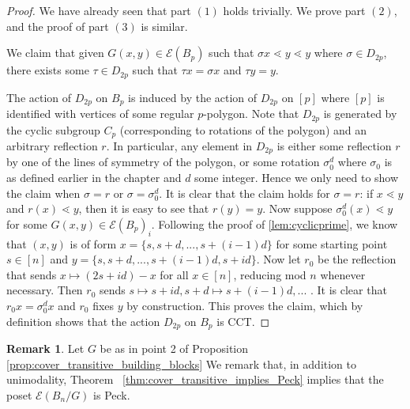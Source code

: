 \documentclass[10 pt]{amsart}
\theoremstyle{plain}
\theoremstyle{definition}
\newtheorem{rem}[thm]{Remark}
\theoremstyle{remark}
\numberwithin{equation}{section}
\begin{document}
\begin{proof}
We have already seen that part $(1)$ holds trivially. We prove part $(2)$, and the proof of part $(3)$ is similar. 

We claim that given $G(x, y) \in \mathcal E (B_p)$ such that $\sigma x \lessdot y \lessdot y$ where $\sigma \in D_{2p}$, there exists some $\tau \in D_{2p}$ such that $\tau x = \sigma x$ and $\tau y = y$. 

The action of $D_{2p}$ on $B_p$ is induced by the action of $D_{2p}$ on $[p]$ where $[p]$ is identified with vertices of some regular $p$-polygon. Note that $D_{2p}$ is generated by the cyclic subgroup $C_p$ (corresponding to rotations of the polygon) and an arbitrary reflection $r$. In particular, any element in $D_{2p}$ is either some reflection $r$ by one of the lines of symmetry of the polygon, or some rotation $\sigma_0^{d} $ where $\sigma_0$ is as defined earlier in the chapter and $d$ some integer. Hence we only need to show the claim when $\sigma = r$ or $\sigma = \sigma_0^d$. It is clear that the claim holds for $\sigma = r$: if $x \lessdot y$ and $r (x) \lessdot y$, then it is easy to see that $r (y) = y$. Now suppose $\sigma_0^d (x) \lessdot y$ for some $G(x,y) \in \mathcal E(B_p)_i$.  Following the proof of \ref{lem:cyclicprime}, we know that $(x, y)$ is of form $x = \{s, s+d, ..., s+(i-1)d\}$ for some starting point $s \in [n]$ and $y = \{s, s+d, ..., s+(i-1)d, s + id\}$. Now let $r_0$ be the reflection that sends $x \mapsto (2s+ id)-x$ for all $x \in [n]$, reducing mod $n$ whenever necessary. Then $r_0$ sends $s \mapsto s+id, s+d \mapsto s+ (i-1)d, ...$ . It is clear that $r_0 x = \sigma_0^d x$ and $r_0$ fixes $y$ by construction. This proves the claim, which by definition shows that  the action $D_{2p}$ on $B_p$ is CCT. 
\end{proof}

\begin{rem}
Let $G$ be as in point 2 of Proposition \ref{prop:cover_transitive_building_blocks} We remark that, in addition to unimodality, Theorem ~\ref{thm:cover_transitive_implies_Peck} implies that the poset $\mathcal E(B_n/G)$ is Peck.
\end{rem}

\end{document}
